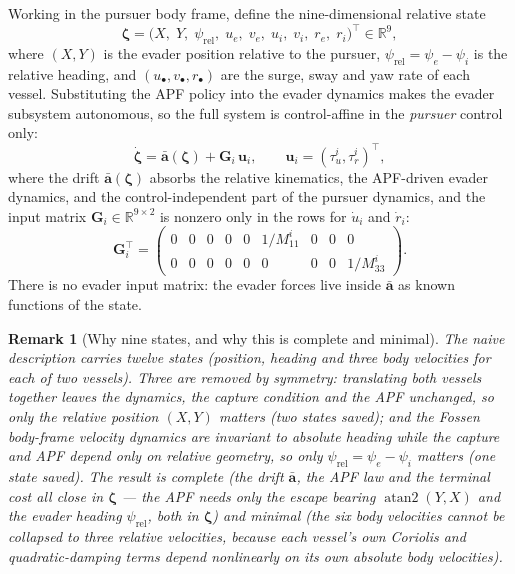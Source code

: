 \documentclass[11pt]{article}
\newtheorem{remark}{Remark}
\newcommand{\R}{\mathbb{R}}
\newcommand{\zbf}{\bm{\zeta}}
\newcommand{\abf}{\bar{\bm{a}}}
\newcommand{\Gbf}{\bm{G}}
\newcommand{\ubf}{\bm{u}}
\begin{document}
Working in the pursuer body frame, define the nine-dimensional relative state
\begin{equation}
\zbf=\big(X,\;Y,\;\psi_{\mathrm{rel}},\;u_e,\;v_e,\;u_i,\;v_i,\;r_e,\;r_i\big)^\top\in\R^9 ,
\end{equation}
where $(X,Y)$ is the evader position relative to the pursuer, $\psi_{\mathrm{rel}}=\psi_e-\psi_i$
is the relative heading, and $(u_\bullet,v_\bullet,r_\bullet)$ are the surge, sway and yaw rate of
each vessel. Substituting the APF policy into the evader dynamics makes the evader subsystem
autonomous, so the full system is control-affine in the \emph{pursuer} control only:
\begin{equation}\label{eq:affine}
\dot{\zbf}=\abf(\zbf)+\Gbf_i\,\ubf_i,\qquad \ubf_i=(\tau_u^i,\tau_r^i)^\top ,
\end{equation}
where the drift $\abf(\zbf)$ absorbs the relative kinematics, the APF-driven evader dynamics, and
the control-independent part of the pursuer dynamics, and the input matrix $\Gbf_i\in\R^{9\times2}$
is nonzero only in the rows for $\dot u_i$ and $\dot r_i$:
\begin{equation}
\Gbf_i^\top=\begin{pmatrix}
0&0&0&0&0&1/M_{11}^i&0&0&0\\
0&0&0&0&0&0&0&0&1/M_{33}^i
\end{pmatrix}.
\end{equation}
There is no evader input matrix: the evader forces live inside $\abf$ as known functions of the
state.

\begin{remark}[Why nine states, and why this is complete and minimal]
The naive description carries twelve states (position, heading and three body velocities for each
of two vessels). Three are removed by symmetry: translating both vessels together leaves the
dynamics, the capture condition and the APF unchanged, so only the relative position $(X,Y)$
matters (two states saved); and the Fossen body-frame velocity dynamics are invariant to absolute
heading while the capture and APF depend only on relative geometry, so only
$\psi_{\mathrm{rel}}=\psi_e-\psi_i$ matters (one state saved). The result is \emph{complete}
(the drift $\abf$, the APF law and the terminal cost all close in $\zbf$ --- the APF needs only the
escape bearing $\operatorname{atan2}(Y,X)$ and the evader heading $\psi_{\mathrm{rel}}$, both in
$\zbf$) and \emph{minimal} (the six body velocities cannot be collapsed to three relative
velocities, because each vessel's own Coriolis and quadratic-damping terms depend nonlinearly on
its own absolute body velocities).
\end{remark}
\end{document}
